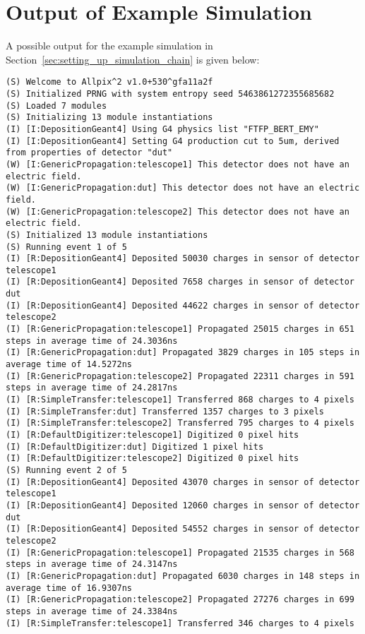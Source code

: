 \section{Output of Example Simulation}
\label{sec:example_output}
A possible output for the example simulation in Section~\ref{sec:setting_up_simulation_chain} is given below:

\begin{lstlisting}[breaklines]
(S) Welcome to Allpix^2 v1.0+530^gfa11a2f
(S) Initialized PRNG with system entropy seed 5463861272355685682
(S) Loaded 7 modules
(S) Initializing 13 module instantiations
(I) [I:DepositionGeant4] Using G4 physics list "FTFP_BERT_EMY"
(I) [I:DepositionGeant4] Setting G4 production cut to 5um, derived from properties of detector "dut"
(W) [I:GenericPropagation:telescope1] This detector does not have an electric field.
(W) [I:GenericPropagation:dut] This detector does not have an electric field.
(W) [I:GenericPropagation:telescope2] This detector does not have an electric field.
(S) Initialized 13 module instantiations
(S) Running event 1 of 5
(I) [R:DepositionGeant4] Deposited 50030 charges in sensor of detector telescope1
(I) [R:DepositionGeant4] Deposited 7658 charges in sensor of detector dut
(I) [R:DepositionGeant4] Deposited 44622 charges in sensor of detector telescope2
(I) [R:GenericPropagation:telescope1] Propagated 25015 charges in 651 steps in average time of 24.3036ns
(I) [R:GenericPropagation:dut] Propagated 3829 charges in 105 steps in average time of 14.5272ns
(I) [R:GenericPropagation:telescope2] Propagated 22311 charges in 591 steps in average time of 24.2817ns
(I) [R:SimpleTransfer:telescope1] Transferred 868 charges to 4 pixels
(I) [R:SimpleTransfer:dut] Transferred 1357 charges to 3 pixels
(I) [R:SimpleTransfer:telescope2] Transferred 795 charges to 4 pixels
(I) [R:DefaultDigitizer:telescope1] Digitized 0 pixel hits
(I) [R:DefaultDigitizer:dut] Digitized 1 pixel hits
(I) [R:DefaultDigitizer:telescope2] Digitized 0 pixel hits
(S) Running event 2 of 5
(I) [R:DepositionGeant4] Deposited 43070 charges in sensor of detector telescope1
(I) [R:DepositionGeant4] Deposited 12060 charges in sensor of detector dut
(I) [R:DepositionGeant4] Deposited 54552 charges in sensor of detector telescope2
(I) [R:GenericPropagation:telescope1] Propagated 21535 charges in 568 steps in average time of 24.3147ns
(I) [R:GenericPropagation:dut] Propagated 6030 charges in 148 steps in average time of 16.9307ns
(I) [R:GenericPropagation:telescope2] Propagated 27276 charges in 699 steps in average time of 24.3384ns
(I) [R:SimpleTransfer:telescope1] Transferred 346 charges to 4 pixels

\end{lstlisting}
